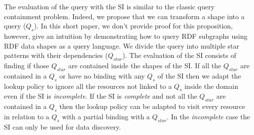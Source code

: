 The evaluation of the query   with the SI is similar to the classic query containment problem.
Indeed, we propose that we can transform a shape into a query ($Q_{s}$).
In this short paper, we don't provide proof for this proposition, however, 
\citeauthor{Delva2021} give an intuition by demonstrating how to query RDF subgraphs using RDF data shapes as a query language.
We divide the query into multiple star patterns with their dependencies ($Q_{star}$).
The evaluation of the SI consists of finding if those $Q_{star}$ are contained inside the shapes of the SI.
If all the $Q_{star}$ are contained in a $Q_{s}$ or have no binding with any $Q_{s}$ of the SI
then we adapt the lookup policy  to ignore all the resources not linked to a $Q_{s}$ inside the domain even if the SI is \emph{incomplete}.
If the SI is \emph{complete} and not all the $Q_{star}$ are contained in a $Q_{s}$ then the lookup policy can be adapted
to visit every resource in relation to a $Q_{s}$ with a partial binding with a $Q_{star}$. 
In the \emph{incomplete} case the SI can only be used for data discovery.
